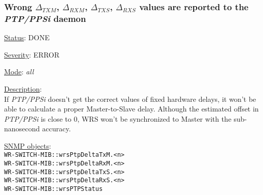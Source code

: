 \subsubsection{\bf Wrong $\Delta_{TXM}$, $\Delta_{RXM}$, $\Delta_{TXS}$,
		$\Delta_{RXS}$ values are reported to the \emph{PTP/PPSi} daemon}
		\label{fail:timing:deltas_report}
		\begin{packed_enum}
			\item [] \underline{Status}: DONE
			\item [] \underline{Severity}: ERROR
			\item [] \underline{Mode}: \emph{all}
			\item [] \underline{Description}:\\
				If \emph{PTP/PPSi} doesn't get the correct values of fixed hardware delays,
				it won't be able to calculate a proper Master-to-Slave delay. Although
				the estimated offset in \emph{PTP/PPSi} is close to 0, WRS won't be
				synchronized to Master with the sub-nanosecond accuracy.
			\item [] \underline{SNMP objects}:\\
				\texttt{WR-SWITCH-MIB::wrsPtpDeltaTxM.<n>}\\
				\texttt{WR-SWITCH-MIB::wrsPtpDeltaRxM.<n>}\\
				\texttt{WR-SWITCH-MIB::wrsPtpDeltaTxS.<n>}\\
				\texttt{WR-SWITCH-MIB::wrsPtpDeltaRxS.<n>}\\
				\texttt{WR-SWITCH-MIB::wrsPTPStatus}
		\end{packed_enum}

